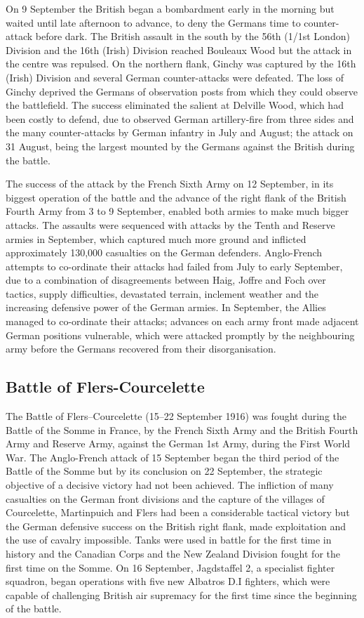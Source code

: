 \documentclass[a4paper,]{book}
\begin{document}
On 9 September the British began a bombardment early in the morning but waited until late afternoon to advance, to deny the Germans time to counter-attack before dark. The British assault in the south by the 56th (1/1st London) Division and the 16th (Irish) Division reached Bouleaux Wood but the attack in the centre was repulsed. On the northern flank, Ginchy was captured by the 16th (Irish) Division and several German counter-attacks were defeated. The loss of Ginchy deprived the Germans of observation posts from which they could observe the battlefield. The success eliminated the salient at Delville Wood, which had been costly to defend, due to observed German artillery-fire from three sides and the many counter-attacks by German infantry in July and August; the attack on 31 August, being the largest mounted by the Germans against the British during the battle.

The success of the attack by the French Sixth Army on 12 September, in its biggest operation of the battle and the advance of the right flank of the British Fourth Army from 3 to 9 September, enabled both armies to make much bigger attacks. The assaults were sequenced with attacks by the Tenth and Reserve armies in September, which captured much more ground and inflicted approximately 130,000 casualties on the German defenders. Anglo-French attempts to co-ordinate their attacks had failed from July to early September, due to a combination of disagreements between Haig, Joffre and Foch over tactics, supply difficulties, devastated terrain, inclement weather and the increasing defensive power of the German armies. In September, the Allies managed to co-ordinate their attacks; advances on each army front made adjacent German positions vulnerable, which were attacked promptly by the neighbouring army before the Germans recovered from their disorganisation.

\subsection{Battle of Flers-Courcelette}

The Battle of Flers–Courcelette (15–22 September 1916) was fought during the Battle of the Somme in France, by the French Sixth Army and the British Fourth Army and Reserve Army, against the German 1st Army, during the First World War. The Anglo-French attack of 15 September began the third period of the Battle of the Somme but by its conclusion on 22 September, the strategic objective of a decisive victory had not been achieved. The infliction of many casualties on the German front divisions and the capture of the villages of Courcelette, Martinpuich and Flers had been a considerable tactical victory but the German defensive success on the British right flank, made exploitation and the use of cavalry impossible. Tanks were used in battle for the first time in history and the Canadian Corps and the New Zealand Division fought for the first time on the Somme. On 16 September, Jagdstaffel 2, a specialist fighter squadron, began operations with five new Albatros D.I fighters, which were capable of challenging British air supremacy for the first time since the beginning of the battle.
\end{document}
